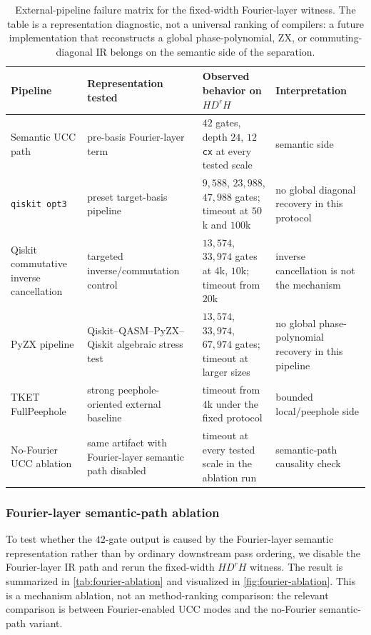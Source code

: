 \documentclass[11pt]{article}
\begin{document}
\begin{table}[t]
\centering
\scriptsize
\begin{tabular}{@{}>{\raggedright\arraybackslash}p{}
                >{\raggedright\arraybackslash}p{}
                >{\raggedright\arraybackslash}p{}
                >{\raggedright\arraybackslash}p{}@{}}
\toprule
Pipeline & Representation tested & Observed behavior on $H D^r H$ & Interpretation \\
\midrule
Semantic UCC path
& pre-basis Fourier-layer term
& $42$ gates, depth $24$, $12$ \texttt{cx} at every tested scale
& semantic side \\
\texttt{qiskit opt3}
& preset target-basis pipeline
& $9{,}588$, $23{,}988$, $47{,}988$ gates; timeout at $50$k and $100$k
& no global diagonal recovery in this protocol \\
Qiskit commutative inverse cancellation
& targeted inverse/commutation control
& $13{,}574$, $33{,}974$ gates at $4$k, $10$k; timeout from $20$k
& inverse cancellation is not the mechanism \\
PyZX pipeline
& Qiskit--QASM--PyZX--Qiskit algebraic stress test
& $13{,}574$, $33{,}974$, $67{,}974$ gates; timeout at larger sizes
& no global phase-polynomial recovery in this pipeline \\
TKET FullPeephole
& strong peephole-oriented external baseline
& timeout from $4$k under the fixed protocol
& bounded local/peephole side \\
No-Fourier UCC ablation
& same artifact with Fourier-layer semantic path disabled
& timeout at every tested scale in the ablation run
& semantic-path causality check \\
\bottomrule
\end{tabular}
\caption{External-pipeline failure matrix for the fixed-width Fourier-layer witness. The table is a representation diagnostic, not a universal ranking of compilers: a future implementation that reconstructs a global phase-polynomial, ZX, or commuting-diagonal IR belongs on the semantic side of the separation.}
\label{tab:external-failure-matrix}
\end{table}

\subsubsection{Fourier-layer semantic-path ablation}

To test whether the $42$-gate output is caused by the Fourier-layer semantic
representation rather than by ordinary downstream pass ordering, we disable
the Fourier-layer IR path and rerun the fixed-width $H D^r H$ witness. The
result is summarized in \cref{tab:fourier-ablation} and visualized in
\cref{fig:fourier-ablation}. This is a mechanism ablation, not an
method-ranking comparison: the relevant comparison is between
Fourier-enabled UCC modes and the no-Fourier semantic-path variant.
\end{document}
